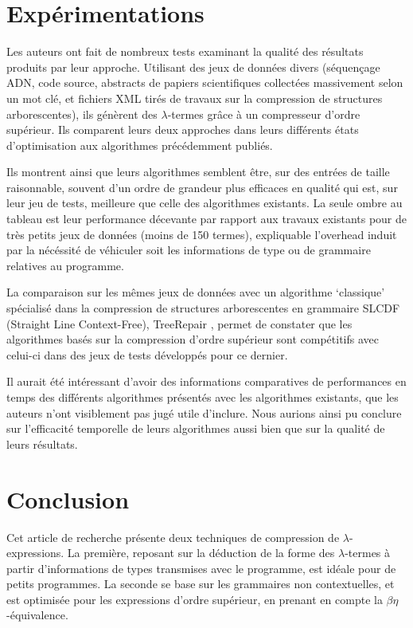 \documentclass[titlepage]{article}
\begin{document}
\section{Expérimentations}\label{expuxe9rimentations}

Les auteurs ont fait de nombreux tests examinant la qualité des
résultats produits par leur approche. Utilisant des jeux de données
divers (séquençage ADN, code source, abstracts de papiers scientifiques
collectées massivement selon un mot clé, et fichiers XML tirés de
travaux sur la compression de structures arborescentes), ils génèrent
des \(\lambda\)-termes grâce à un compresseur d'ordre supérieur. Ils
comparent leurs deux approches dans leurs différents états
d'optimisation aux algorithmes précédemment publiés.

Ils montrent ainsi que leurs algorithmes semblent être, sur des entrées
de taille raisonnable, souvent d'un ordre de grandeur plus efficaces en
qualité qui est, sur leur jeu de tests, meilleure que celle des
algorithmes existants. La seule ombre au tableau est leur performance
décevante par rapport aux travaux existants \cite{tromp2007binary,vytiniotis2010functional,kennedy2012every} pour de très petits jeux de
données (moins de 150 termes), expliquable l'overhead induit par la
nécéssité de véhiculer soit les informations de type ou de grammaire
relatives au programme.

La comparaison sur les mêmes jeux de données avec un algorithme
`classique' spécialisé dans la compression de structures arborescentes
en grammaire SLCDF (Straight Line Context-Free), TreeRepair \cite{lohrey2011tree}, permet de
constater que les algorithmes basés sur la compression d'ordre supérieur
sont compétitifs avec celui-ci dans des jeux de tests développés pour ce
dernier.

Il aurait été intéressant d'avoir des informations comparatives de
performances en temps des différents algorithmes présentés avec les
algorithmes existants, que les auteurs n'ont visiblement pas jugé utile
d'inclure. Nous aurions ainsi pu conclure sur l'efficacité temporelle de
leurs algorithmes aussi bien que sur la qualité de leurs résultats.

\section{Conclusion}\label{conclusion}

Cet article de recherche présente deux techniques de compression de
\(\lambda\)-expressions. La première, reposant sur la déduction de la
forme des \(\lambda\)-termes à partir d'informations de types transmises
avec le programme, est idéale pour de petits programmes. La seconde se
base sur les grammaires non contextuelles, et est optimisée pour les
expressions d'ordre supérieur, en prenant en compte la
$\beta\eta$-équivalence.
\end{document}
